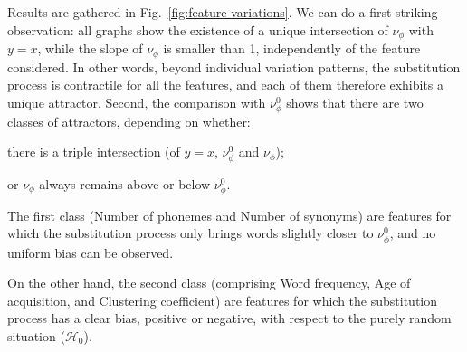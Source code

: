 \medskip






Results are gathered in Fig.~\ref{fig:feature-variations}.
We can do a first striking observation: all graphs show the existence of a unique intersection of $\nu_{\phi}$ with $y=x$, while the slope of $\nu_{\phi}$ is smaller than 1, independently of the feature considered.
In other words, beyond individual variation patterns, the substitution process is contractile for all the features, and each of them therefore exhibits a unique attractor.
Second, the comparison with $\nu_{\phi}^0$ shows that there are two classes of attractors, depending on whether:
\begin{APAenumerate}
\item there is a triple intersection (of $y=x$, $\nu_{\phi}^0$ and $\nu_{\phi}$);
\item or $\nu_{\phi}$ always remains above or below $\nu_{\phi}^0$.
\end{APAenumerate}
The first class (Number of phonemes and Number of synonyms) are features for which the substitution process only brings words slightly closer to $\nu_{\phi}^0$, and no uniform bias can be observed.


On the other hand, the second class (comprising Word frequency, Age of acquisition, and Clustering coefficient) are features for which the substitution process has a clear bias, positive or negative, with respect to the purely random situation ($\mathcal{H}_0$).

